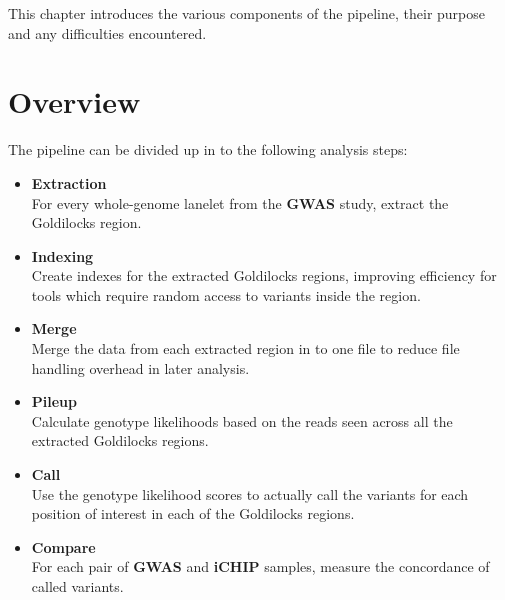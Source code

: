 This chapter introduces the various components of the pipeline, their purpose
and any difficulties encountered.

\section{Overview}


The pipeline can be divided up in to the following analysis steps:

\begin{itemize}
    \item \textbf{Extraction} \hfill\\
        For every whole-genome lanelet from the \textbf{GWAS} study, extract the
        Goldilocks region.
    \item \textbf{Indexing} \hfill\\
        Create indexes for the extracted Goldilocks regions, improving
        efficiency for tools which require random access to variants inside the
        region.
    \item \textbf{Merge} \hfill\\
        Merge the data from each extracted region in to one file to reduce file
        handling overhead in later analysis.
    \item \textbf{Pileup} \hfill\\
        Calculate genotype likelihoods based on the reads seen across all the
        extracted Goldilocks regions.
    \item \textbf{Call} \hfill\\
        Use the genotype likelihood scores to actually call the variants for
        each position of interest in each of the Goldilocks regions.
    \item \textbf{Compare} \hfill\\
        For each pair of \textbf{GWAS} and \textbf{iCHIP} samples, measure the
        concordance of called variants.
\end{itemize}

